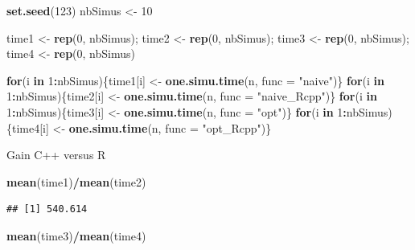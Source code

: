 \documentclass[
]{article}
\newenvironment{Shaded}{\begin{snugshade}}{\end{snugshade}}
\newcommand{\AttributeTok}[1]{\textcolor[rgb]{0.13,0.29,0.53}{#1}}
\newcommand{\ControlFlowTok}[1]{\textcolor[rgb]{0.13,0.29,0.53}{\textbf{#1}}}
\newcommand{\DecValTok}[1]{\textcolor[rgb]{0.00,0.00,0.81}{#1}}
\newcommand{\FunctionTok}[1]{\textcolor[rgb]{0.13,0.29,0.53}{\textbf{#1}}}
\newcommand{\NormalTok}[1]{#1}
\newcommand{\OtherTok}[1]{\textcolor[rgb]{0.56,0.35,0.01}{#1}}
\newcommand{\SpecialCharTok}[1]{\textcolor[rgb]{0.81,0.36,0.00}{\textbf{#1}}}
\newcommand{\StringTok}[1]{\textcolor[rgb]{0.31,0.60,0.02}{#1}}
\begin{document}
\begin{Shaded}
\begin{Highlighting}[]
\FunctionTok{set.seed}\NormalTok{(}\DecValTok{123}\NormalTok{)}
\NormalTok{nbSimus }\OtherTok{\textless{}{-}} \DecValTok{10}

\NormalTok{time1 }\OtherTok{\textless{}{-}} \FunctionTok{rep}\NormalTok{(}\DecValTok{0}\NormalTok{, nbSimus); time2 }\OtherTok{\textless{}{-}} \FunctionTok{rep}\NormalTok{(}\DecValTok{0}\NormalTok{, nbSimus);}
\NormalTok{time3 }\OtherTok{\textless{}{-}} \FunctionTok{rep}\NormalTok{(}\DecValTok{0}\NormalTok{, nbSimus); time4 }\OtherTok{\textless{}{-}} \FunctionTok{rep}\NormalTok{(}\DecValTok{0}\NormalTok{, nbSimus)}

\ControlFlowTok{for}\NormalTok{(i }\ControlFlowTok{in} \DecValTok{1}\SpecialCharTok{:}\NormalTok{nbSimus)\{time1[i] }\OtherTok{\textless{}{-}} \FunctionTok{one.simu.time}\NormalTok{(n, }\AttributeTok{func =} \StringTok{"naive"}\NormalTok{)\}}
\ControlFlowTok{for}\NormalTok{(i }\ControlFlowTok{in} \DecValTok{1}\SpecialCharTok{:}\NormalTok{nbSimus)\{time2[i] }\OtherTok{\textless{}{-}} \FunctionTok{one.simu.time}\NormalTok{(n, }\AttributeTok{func =} \StringTok{"naive\_Rcpp"}\NormalTok{)\}}
\ControlFlowTok{for}\NormalTok{(i }\ControlFlowTok{in} \DecValTok{1}\SpecialCharTok{:}\NormalTok{nbSimus)\{time3[i] }\OtherTok{\textless{}{-}} \FunctionTok{one.simu.time}\NormalTok{(n, }\AttributeTok{func =} \StringTok{"opt"}\NormalTok{)\}}
\ControlFlowTok{for}\NormalTok{(i }\ControlFlowTok{in} \DecValTok{1}\SpecialCharTok{:}\NormalTok{nbSimus)\{time4[i] }\OtherTok{\textless{}{-}} \FunctionTok{one.simu.time}\NormalTok{(n, }\AttributeTok{func =} \StringTok{"opt\_Rcpp"}\NormalTok{)\}}
\end{Highlighting}
\end{Shaded}

Gain C++ versus R

\begin{Shaded}
\begin{Highlighting}[]
\FunctionTok{mean}\NormalTok{(time1)}\SpecialCharTok{/}\FunctionTok{mean}\NormalTok{(time2)}
\end{Highlighting}
\end{Shaded}

\begin{verbatim}
## [1] 540.614
\end{verbatim}

\begin{Shaded}
\begin{Highlighting}[]
\FunctionTok{mean}\NormalTok{(time3)}\SpecialCharTok{/}\FunctionTok{mean}\NormalTok{(time4)}
\end{Highlighting}
\end{Shaded}
\end{document}
